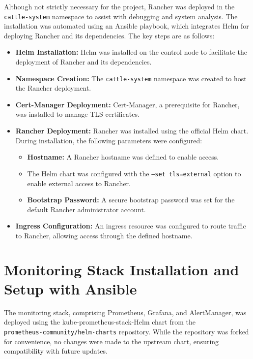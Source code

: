 Although not strictly necessary for the project, Rancher was deployed in the\\
\texttt{cattle-system} namespace to assist with debugging and system analysis. The installation was automated using an Ansible playbook, which integrates Helm for deploying Rancher and its dependencies. The key steps are as follows:

\begin{itemize}
\item \textbf{Helm Installation:} Helm was installed on the control node to facilitate the deployment of Rancher and its dependencies.
\item \textbf{Namespace Creation:} The \texttt{cattle-system} namespace was created to host the Rancher deployment.
\item \textbf{Cert-Manager Deployment:} Cert-Manager, a prerequisite for Rancher, was installed to manage TLS certificates.
\item \textbf{Rancher Deployment:} Rancher was installed using the official Helm chart. During installation, the following parameters were configured:
  \begin{itemize}
  \item \textbf{Hostname:} A Rancher hostname was defined to enable access.
  \item The Helm chart was configured with the \texttt{--set tls=external} option to enable external access to Rancher.
  \item \textbf{Bootstrap Password:} A secure bootstrap password was set for the default Rancher administrator account.
  \end{itemize}
\item \textbf{Ingress Configuration:} An ingress resource was configured to route traffic to Rancher, allowing access through the defined hostname.
\end{itemize}



\section{Monitoring Stack Installation and Setup with Ansible}

The monitoring stack, comprising Prometheus, Grafana, and AlertManager, was deployed using the kube-prometheus-stack\parencite{prometheus_helm_charts}-Helm chart from the\\\texttt{prometheus-community/helm-charts} repository. While the repository was forked for convenience, no changes were made to the upstream chart, ensuring compatibility with future updates.

